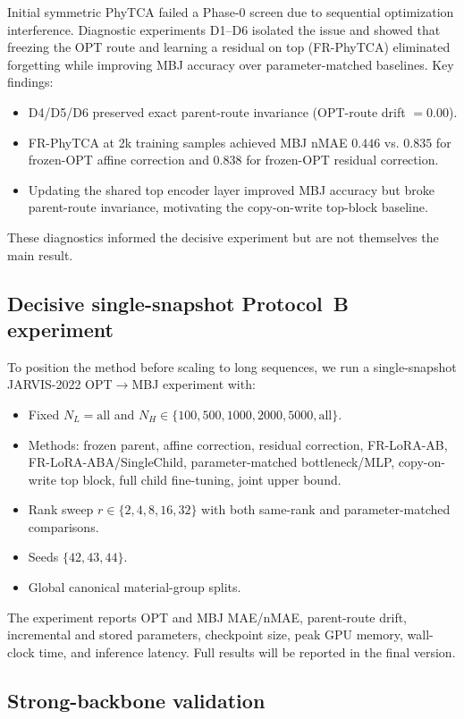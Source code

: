 \documentclass{article}
\theoremstyle{plain}
\theoremstyle{definition}
\theoremstyle{remark}
\begin{document}
Initial symmetric PhyTCA failed a Phase-0 screen due to sequential optimization interference. Diagnostic experiments D1--D6 isolated the issue and showed that freezing the OPT route and learning a residual on top (FR-PhyTCA) eliminated forgetting while improving MBJ accuracy over parameter-matched baselines. Key findings:
\begin{itemize}[leftmargin=*]
    \item D4/D5/D6 preserved exact parent-route invariance (OPT-route drift $=0.00$).
    \item FR-PhyTCA at 2k training samples achieved MBJ nMAE $0.446$ vs. $0.835$ for frozen-OPT affine correction and $0.838$ for frozen-OPT residual correction.
    \item Updating the shared top encoder layer improved MBJ accuracy but broke parent-route invariance, motivating the copy-on-write top-block baseline.
\end{itemize}
These diagnostics informed the decisive experiment but are not themselves the main result.

\subsection{Decisive single-snapshot Protocol~B experiment}

To position the method before scaling to long sequences, we run a single-snapshot JARVIS-2022 OPT$\to$MBJ experiment with:
\begin{itemize}[leftmargin=*]
    \item Fixed $N_L=\text{all}$ and $N_H\in\{100,500,1000,2000,5000,\text{all}\}$.
    \item Methods: frozen parent, affine correction, residual correction, FR-LoRA-AB, FR-LoRA-ABA/SingleChild, parameter-matched bottleneck/MLP, copy-on-write top block, full child fine-tuning, joint upper bound.
    \item Rank sweep $r\in\{2,4,8,16,32\}$ with both same-rank and parameter-matched comparisons.
    \item Seeds $\{42,43,44\}$.
    \item Global canonical material-group splits.
\end{itemize}
The experiment reports OPT and MBJ MAE/nMAE, parent-route drift, incremental and stored parameters, checkpoint size, peak GPU memory, wall-clock time, and inference latency. Full results will be reported in the final version.

\subsection{Strong-backbone validation}
\end{document}
